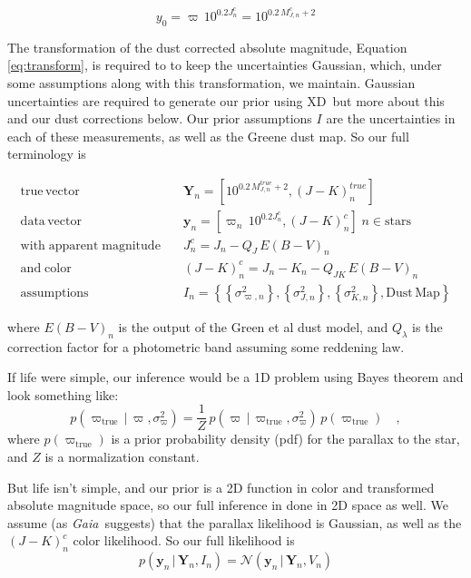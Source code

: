 \documentclass[modern]{aastex61}
\newcommand{\acronym}[1]{{\small{#1}}}
\newcommand{\project}[1]{\textsl{#1}}
\newcommand{\gaia}{\project{Gaia}}
\newcommand{\xd}{\acronym{XD}}
\newcommand{\given}{\,|\,}
\newcommand{\true}{\mathrm{true}}
\begin{document}
\begin{equation}
y_0 = \varpi\,10^{0.2J^c_n} = 10^{0.2\,M^c_{J,n} + 2}
\label{eq:transform}
\end{equation}

The transformation of the dust corrected absolute magnitude, Equation \ref{eq:transform}, is required to to keep the uncertainties Gaussian, which, under some assumptions along with this transformation, we maintain. Gaussian uncertainties are required to generate our prior using \xd\, but more about this and our dust corrections below.
Our prior assumptions $I$ are the uncertainties in each of these measurements, as well as the Greene dust map. So our full terminology is

\begin{equation}
\begin{aligned}
\mathrm{true \, vector} \quad &\mathbf{Y}_n = [10^{0.2\,M^{true}_{J,n} + 2}, (J-K)^{true}_n] \\
\mathrm{data \, vector} \quad &\mathbf{y}_n = [\varpi_n\,10^{0.2J^c_n}, (J- K)^c_n] \;  n \in \mathrm{stars} \\
\mathrm{with \; apparent \; magnitude} \quad &J^c_n = J_n - Q_J\,E(B-V)_n \\
\mathrm{and \; color} \quad &(J - K)^c_n = J_n - K_n - Q_{JK}\,E(B-V)_n \\
\mathrm{assumptions} \quad &I_n = \left\{\left\{\sigma^2_{\varpi, n}\right\}, \left\{\sigma^2_{J,n}\right\}, \left\{\sigma^2_{K,n}\right\}, \mathrm{Dust \, Map}\right\}
\end{aligned}
\label{eq:data}
\end{equation}

where $E(B-V)_n$ is the output of the Green et al dust model, and $Q_{\lambda}$ is the correction factor for a photometric band assuming some reddening law.

If life were simple, our inference would be a 1D problem using Bayes theorem and look something like:
\begin{equation}
p(\varpi_{\true} \given \varpi, \sigma^2_{\varpi}) = \frac{1}{Z}\,p(\varpi \given \varpi_{\true}, \sigma^2_{\varpi}) \, p(\varpi_{\true}) \quad ,
\label{eq:bayes}
\end{equation}
where $p(\varpi_{\true})$ is a prior probability density (pdf) for the
parallax to the star, and $Z$ is a normalization constant.

But life isn't simple, and our prior is a 2D function in color and transformed absolute magnitude space, so our full inference in done in 2D space as well.
We assume (as \gaia\ suggests) that the parallax likelihood is Gaussian, as well as the $(J-K)^c_n$ color likelihood. So our full likelihood is
\begin{equation}
p(\mathbf{y}_n \given \mathbf{Y}_n, I_n) = \mathcal{N}(\mathbf{y}_n \given \mathbf{Y}_n, V_n)
\end{equation}
\end{document}
